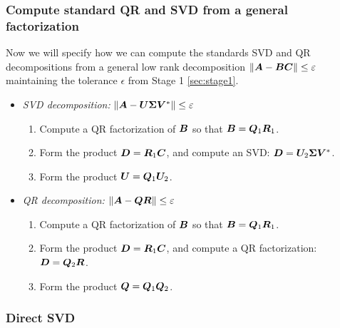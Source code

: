 \subsubsection{Compute standard QR and SVD from a general factorization}
Now we will specify how we can compute the standards SVD and QR decompositions
from a general low rank decomposition $\|\bm{A} - \bm{B}\bm{C}\|\leq\varepsilon$
maintaining the tolerance $\epsilon$ from Stage 1 \ref{sec:stage1}.

\begin{itemize}
  \item \label{itm:SVD-from-C} \textit{SVD decomposition:} $\|\bm{A}-\bm{U}\bm{\Sigma}\bm{V}^*\|\leq\varepsilon$
\lsp
\begin{enumerate}
\item Compute a QR factorization of $\bm{B}$ so that $\bm{B} = \bm{Q}_{1}\bm{R}_{1}$.
\item Form the product $\bm{D} = \bm{R}_{1}\bm{C}$, and compute an SVD:
      $\bm{D} = \bm{U}_{2}\bm{\Sigma}\bm{V}^{*}$.
\item Form the product $\bm{U} = \bm{Q}_{1}\bm{U}_{2}$.
\end{enumerate}
\lsp

\item \label{itm:QR-from-C} \textit{QR decomposition:} $\|\bm{A}-\bm{Q}\bm{R}\|\leq\varepsilon$
\lsp
\begin{enumerate}
\item Compute a QR factorization of $\bm{B}$ so that $\bm{B} = \bm{Q}_{1}\bm{R}_{1}$.
\item Form the product $\bm{D} = \bm{R}_{1}\bm{C}$, and compute a QR factorization: $\bm{D} = \bm{Q}_{2}\bm{R}$.
\item Form the product $\bm{Q} = \bm{Q}_{1}\bm{Q}_{2}$.
\end{enumerate}

\end{itemize}

\subsubsection{Direct SVD} \label{alg:direct-svd}

